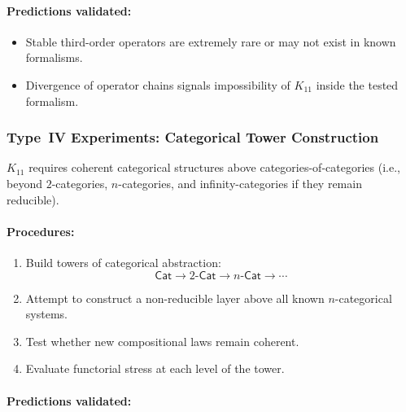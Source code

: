 \paragraph{Predictions validated:}

\begin{itemize}
    \item Stable third-order operators are extremely rare or may not 
          exist in known formalisms.
    \item Divergence of operator chains signals impossibility of 
          $K_{11}$ inside the tested formalism.
\end{itemize}



\subsubsection{Type~IV Experiments: Categorical Tower Construction}

$K_{11}$ requires coherent categorical structures above 
categories-of-categories (i.e., beyond $2$-categories, $n$-categories, 
and infinity-categories if they remain reducible).

\paragraph{Procedures:}

\begin{enumerate}
    \item Build towers of categorical abstraction:
          \[
              \mathsf{Cat}
              \rightarrow
              2\text{-}\mathsf{Cat}
              \rightarrow
              n\text{-}\mathsf{Cat}
              \rightarrow
              \cdots
          \]
    \item Attempt to construct a non-reducible layer above all 
          known $n$-categorical systems.
    \item Test whether new compositional laws remain coherent.
    \item Evaluate functorial stress at each level of the tower.
\end{enumerate}

\paragraph{Predictions validated:}

